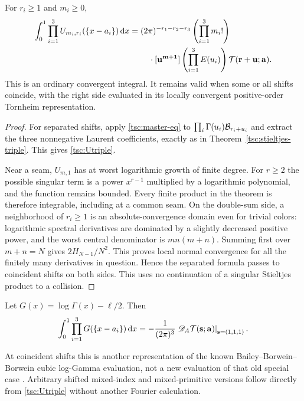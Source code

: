 \begin{theorem}\label{tsc:primitive-triple}
For $r_i\ge1$ and $m_i\ge0$,
\begin{align}\label{tsc:Utriple}
 \int_0^1\prod_{i=1}^3U_{m_i,r_i}(\{x-a_i\})\,\mathrm d x
 ={}&(2\pi)^{-r_1-r_2-r_3}\left(\prod_{i=1}^3m_i!\right)\notag\\
 &\quad\cdot[\mathbf u^{\mathbf m+\mathbf1}]
     \left(\prod_{i=1}^3E(u_i)\right)
                         \mathcal T(\mathbf r+\mathbf u;\mathbf a).
\end{align}
This is an ordinary convergent integral. It remains valid when some or all
shifts coincide, with the right side evaluated in its locally convergent
positive-order Tornheim representation.
\end{theorem}
\begin{proof}
For separated shifts, apply \eqref{tsc:master-eq} to
$\prod_i\Gamma(u_i)\mathcal B_{r_i+u_i}$ and extract the three nonnegative
Laurent coefficients, exactly as in Theorem~\ref{tsc:stieltjes-triple}.
This gives \eqref{tsc:Utriple}.

Near a seam, $U_{m,1}$ has at worst logarithmic growth of finite degree.
For $r\ge2$ the possible singular term is a power $x^{r-1}$ multiplied
by a logarithmic polynomial, and the function remains bounded. Every
finite product in the theorem is therefore integrable, including at a
common seam. On the double-sum side, a neighborhood of $r_i\ge1$ is an
absolute-convergence domain even for trivial colors: logarithmic
spectral derivatives are dominated by a slightly decreased positive power,
and the worst central denominator is $mn(m+n)$. Summing first over
$m+n=N$ gives $2H_{N-1}/N^2$. This proves local normal convergence for
all the finitely many derivatives in question. Hence the separated formula
passes to coincident shifts on both sides. This uses no continuation of a
singular Stieltjes product to a collision.
\end{proof}

\begin{corollary}\label{tsc:loggamma-triple}
Let $G(x)=\log\Gamma(x)-\ell/2$. Then
\begin{equation}\label{tsc:Gtriple}
 \int_0^1\prod_{i=1}^3G(\{x-a_i\})\,\mathrm d x
   =-\frac1{(2\pi)^3}
       \left.\mathscr D_A\mathcal T(\mathbf s;\mathbf a)\right|_{\mathbf s=(1,1,1)}.
\end{equation}
\end{corollary}
At coincident shifts this is another representation of the known
Bailey--Borwein--Borwein cubic log-Gamma evaluation, not a new evaluation
of that old special case \cite{tsc:bbb,tsc:gamma-chapter}. Arbitrary shifted
mixed-index and mixed-primitive versions follow directly from
\eqref{tsc:Utriple} without another Fourier calculation.
